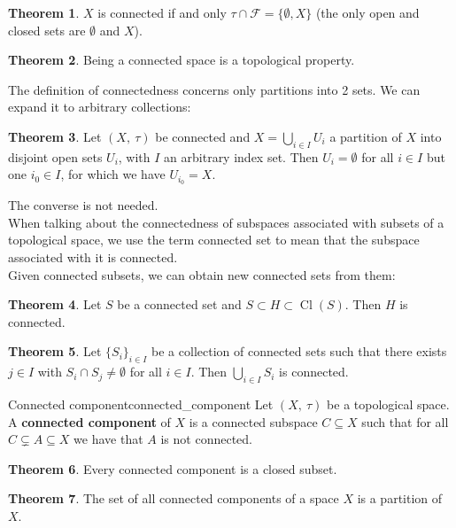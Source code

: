 \documentclass[a4paper]{book}
\theoremstyle{definition}
\newtheorem{theorem}{Theorem}[section]
\theoremstyle{ejemplo}
\theoremstyle{demostracion}
\DeclareMathOperator{\closure}{Cl}
\begin{document}
\begin{theorem}
	$X$ is connected if and only $\tau \cap \mathcal{F} = \{ \emptyset, X\}$ (the only open and closed sets are $\emptyset$ and $X$).
\end{theorem}

\begin{theorem}
	Being a connected space is a topological property.
\end{theorem}

The definition of connectedness concerns only partitions into 2 sets. We can expand it to arbitrary collections:

\begin{theorem}
	Let $(X,\ \tau)$ be connected and $X = \bigcup_{i \in I} U_i$ a partition of $X$ into disjoint open sets $U_i$, with $I$ an arbitrary index set. Then $U_i = \emptyset$ for all $i \in I$ but one $i_0 \in I$, for which we have $U_{i_0} = X$.
\end{theorem}

The converse is not needed.\\ 
When talking about the connectedness of subspaces associated with subsets of a topological space, we use the term connected set to mean that the subspace associated with it is connected.\\ 
Given connected subsets, we can obtain new connected sets from them:
\begin{theorem}
	Let $S$ be a connected set and $S \subset H \subset \closure(S)$. Then $H$ is connected.
\end{theorem}

\begin{theorem}
	Let $\{ S_i\}_{i \in I}$ be a collection of connected sets such that there exists $j \in I$ with $S_i \cap S_j \neq \emptyset$ for all $i \in I$. Then $\bigcup_{i \in I} S_i$ is connected.
\end{theorem}

\begin{define}{Connected component}{connected_component}
	Let $(X,\ \tau)$ be a topological space. A \textbf{connected component} of $X$ is a connected subspace $C \subseteq X$ such that for all $C \subsetneq A \subseteq X$ we have that $A$ is not connected.
\end{define}

\begin{theorem}
	Every connected component is a closed subset.
\end{theorem}

\begin{theorem}
	The set of all connected components of a space $X$ is a partition of $X$.
\end{theorem}
\end{document}
